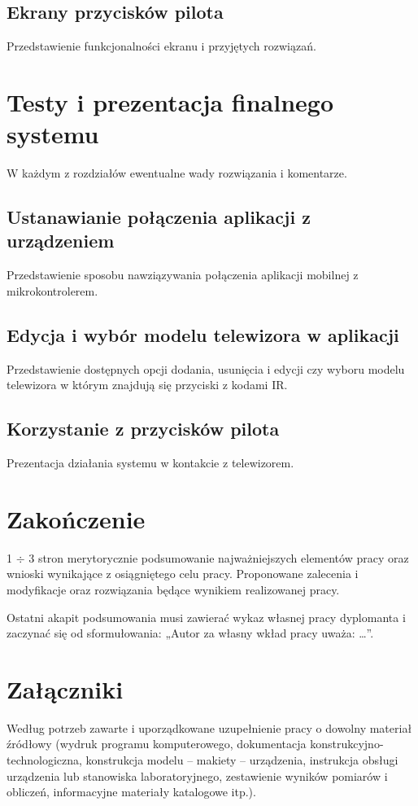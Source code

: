 \documentclass[12pt,twoside,draft]{article}
\begin{document}
\subsection{Ekrany przycisków pilota}
Przedstawienie funkcjonalności ekranu i przyjętych rozwiązań.
\clearpage

\section{Testy i prezentacja finalnego systemu}
W każdym z rozdziałów ewentualne wady rozwiązania i komentarze.
\subsection{Ustanawianie połączenia aplikacji z urządzeniem}
Przedstawienie sposobu nawziązywania połączenia aplikacji mobilnej z mikrokontrolerem.
\subsection{Edycja i wybór modelu telewizora w aplikacji}
Przedstawienie dostępnych opcji dodania, usunięcia i edycji czy wyboru modelu telewizora w którym znajdują się przyciski z kodami IR.
\subsection{Korzystanie z przycisków pilota}
Prezentacja działania systemu w kontakcie z telewizorem.

\clearpage

\section{Zakończenie}

1 $\div$ 3 stron merytorycznie podsumowanie najważniejszych elementów pracy oraz wnioski wynikające z osiągniętego celu pracy. Proponowane zalecenia i modyfikacje oraz rozwiązania będące wynikiem realizowanej pracy.

Ostatni akapit podsumowania musi zawierać wykaz własnej pracy dyplomanta i zaczynać się od sformułowania: „Autor za własny wkład pracy uważa: \ldots”.

\clearpage

\section*{Załączniki}

Według potrzeb zawarte i uporządkowane uzupełnienie pracy o dowolny materiał źródłowy (wydruk programu komputerowego, dokumentacja kons\-truk\-cyj\-no-\-tech\-no\-lo\-gicz\-na, konstrukcja modelu -- makiety -- urządzenia, instrukcja obsługi urządzenia lub stanowiska laboratoryjnego, zestawienie wyników pomiarów i obliczeń, informacyjne materiały katalogowe itp.).
\end{document}
